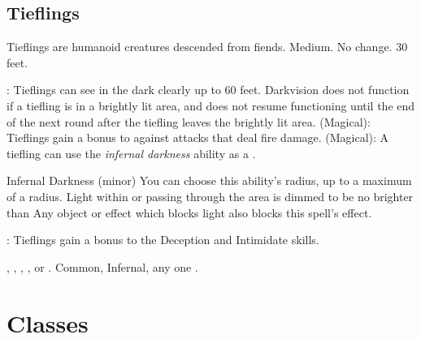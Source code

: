     \subsection{Tieflings}

        Tieflings are humanoid creatures descended from fiends.
         Medium.
         No change.
         30 feet.
        \begin{itemize}
            : Tieflings can see in the dark clearly up to 60 feet. Darkvision does not function if a tiefling is in a brightly lit area, and does not resume functioning until the end of the next round after the tiefling leaves the brightly lit area.
             (Magical): Tieflings gain a  bonus to  against attacks that deal fire damage.
             (Magical): A tiefling can use the \textit{infernal darkness} ability as a .
                \begin{attuneability}{Infernal Darkness}
                     (minor)
                    \rankline
                    You can choose this ability's radius, up to a maximum of a \areamed radius.
                    Light within or passing through the area is dimmed to be no brighter than 
                    Any object or effect which blocks light also blocks this spell's effect.
                \end{attuneability}
            : Tieflings gain a  bonus to the Deception and Intimidate skills.
        \end{itemize}
         , , , , or .
         Common, Infernal, any one .


\section{Classes}
